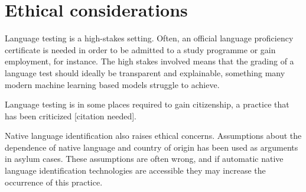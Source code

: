 \section{Ethical considerations}

Language testing is a high-stakes setting. Often, an official language
proficiency certificate is needed in order to be admitted to a study
programme or gain employment, for instance. The high stakes involved means
that the grading of a language test should ideally be transparent and
explainable, something many modern machine learning based models struggle to
achieve.

Language testing is in some places required to gain citizenship, a practice
that has been criticized [citation needed].

Native language identification also raises ethical concerns. Assumptions
about the dependence of native language and country of origin has been used
as arguments in asylum cases. These assumptions are often wrong, and if
automatic native language identification technologies are accessible they may
increase the occurrence of this practice.
